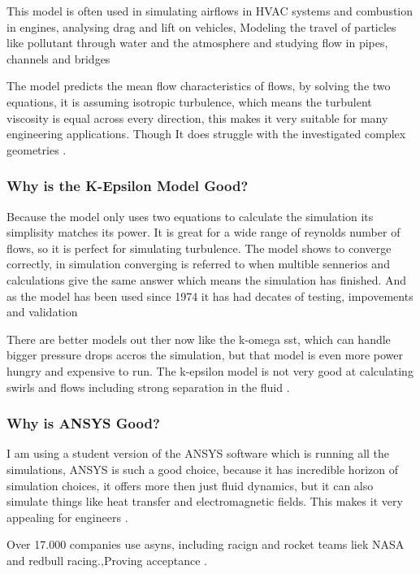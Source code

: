\documentclass[12pt,a4paper]{article}
\begin{document}
This model is often used in simulating airflows in HVAC systems and combustion in engines, analysing drag and lift on vehicles, Modeling the travel of particles like pollutant through water and the atmosphere and studying flow in pipes, channels and bridges \cite{versteeg2007computational}

The model predicts the mean flow characteristics of flows, by solving the two equations, it is assuming isotropic turbulence, which means the turbulent viscosity is equal across every direction, this makes it very suitable for many engineering applications. Though It does struggle with the investigated complex geometries \cite{launder1974application}.

\subsubsection{Why is the K-Epsilon Model Good?}

Because the model only uses two equations to calculate the simulation its simplisity matches its power. It is great for a wide range of reynolds number of flows, so it is perfect for simulating turbulence. The model shows to converge correctly, in simulation converging is referred to when multible sennerios and calculations give the same answer which means the simulation has finished. And as the model has been used since 1974 it has had decates of testing, impovements and validation \cite{launder1974application}

There are better models out ther now like the k-omega sst, which can handle bigger pressure drops accros the simulation, but that model is even more power hungry and expensive to run. The k-epsilon model is not very good at calculating swirls and flows including strong separation in the fluid \cite{blazek2015computational}.

\subsubsection{Why is ANSYS Good?}

I am using a student version of the ANSYS software which is running all the simulations, ANSYS is such a good choice, because it has incredible horizon of simulation choices, it offers more then just fluid dynamics, but it can also simulate things like heat transfer and electromagnetic fields. This makes it very appealing for engineers \cite{ansys2023fluent}. 

Over 17.000 companies use asyns, including racign and rocket teams liek NASA and redbull racing.,Proving acceptance \cite{ansys2023fluent}. 
\end{document}
